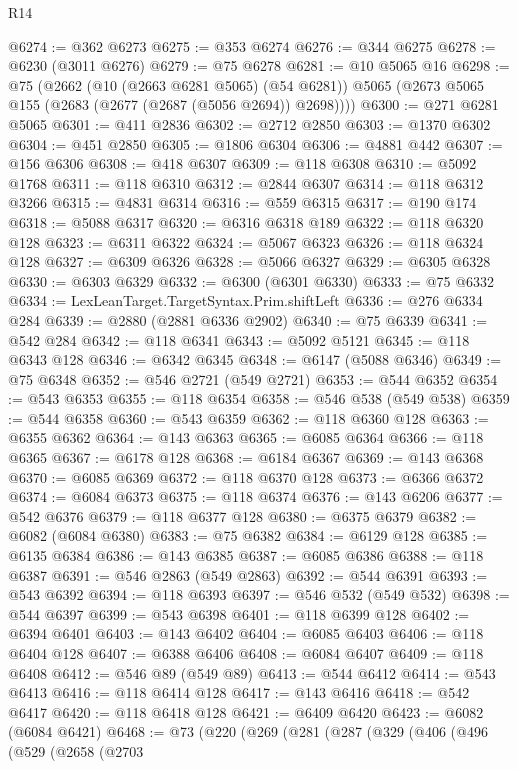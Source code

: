 \begin{lexlean}{R14}
\begin{coremodule}
{{{{{{{{{{{{{{{{{{{{{{{{{{{{{{{{{{{{{{{{{{{{{{{{{{{{{{{{{{{{{{{{{{{{{{{{{{{{{{{{{{@6274 := @362 @6273
@6275 := @353 @6274
@6276 := @344 @6275
@6278 := @6230 (@3011 @6276)
@6279 := @75 @6278
@6281 := @10 @5065 @16
@6298 := @75
    (@2662
      (@10 (@2663 @6281 @5065) (@54 @6281))
      @5065
      (@2673 @5065 @155 (@2683 (@2677 (@2687 (@5056 @2694)) @2698))))
@6300 := @271 @6281 @5065
@6301 := @411 @2836
@6302 := @2712 @2850
@6303 := @1370 @6302
@6304 := @451 @2850
@6305 := @1806 @6304
@6306 := @4881 @442
@6307 := @156 @6306
@6308 := @418 @6307
@6309 := @118 @6308
@6310 := @5092 @1768
@6311 := @118 @6310
@6312 := @2844 @6307
@6314 := @118 @6312 @3266
@6315 := @4831 @6314
@6316 := @559 @6315
@6317 := @190 @174
@6318 := @5088 @6317
@6320 := @6316 @6318 @189
@6322 := @118 @6320 @128
@6323 := @6311 @6322
@6324 := @5067 @6323
@6326 := @118 @6324 @128
@6327 := @6309 @6326
@6328 := @5066 @6327
@6329 := @6305 @6328
@6330 := @6303 @6329
@6332 := @6300 (@6301 @6330)
@6333 := @75 @6332
@6334 := LexLeanTarget.TargetSyntax.Prim.shiftLeft
@6336 := @276 @6334 @284
@6339 := @2880 (@2881 @6336 @2902)
@6340 := @75 @6339
@6341 := @542 @284
@6342 := @118 @6341
@6343 := @5092 @5121
@6345 := @118 @6343 @128
@6346 := @6342 @6345
@6348 := @6147 (@5088 @6346)
@6349 := @75 @6348
@6352 := @546 @2721 (@549 @2721)
@6353 := @544 @6352
@6354 := @543 @6353
@6355 := @118 @6354
@6358 := @546 @538 (@549 @538)
@6359 := @544 @6358
@6360 := @543 @6359
@6362 := @118 @6360 @128
@6363 := @6355 @6362
@6364 := @143 @6363
@6365 := @6085 @6364
@6366 := @118 @6365
@6367 := @6178 @128
@6368 := @6184 @6367
@6369 := @143 @6368
@6370 := @6085 @6369
@6372 := @118 @6370 @128
@6373 := @6366 @6372
@6374 := @6084 @6373
@6375 := @118 @6374
@6376 := @143 @6206
@6377 := @542 @6376
@6379 := @118 @6377 @128
@6380 := @6375 @6379
@6382 := @6082 (@6084 @6380)
@6383 := @75 @6382
@6384 := @6129 @128
@6385 := @6135 @6384
@6386 := @143 @6385
@6387 := @6085 @6386
@6388 := @118 @6387
@6391 := @546 @2863 (@549 @2863)
@6392 := @544 @6391
@6393 := @543 @6392
@6394 := @118 @6393
@6397 := @546 @532 (@549 @532)
@6398 := @544 @6397
@6399 := @543 @6398
@6401 := @118 @6399 @128
@6402 := @6394 @6401
@6403 := @143 @6402
@6404 := @6085 @6403
@6406 := @118 @6404 @128
@6407 := @6388 @6406
@6408 := @6084 @6407
@6409 := @118 @6408
@6412 := @546 @89 (@549 @89)
@6413 := @544 @6412
@6414 := @543 @6413
@6416 := @118 @6414 @128
@6417 := @143 @6416
@6418 := @542 @6417
@6420 := @118 @6418 @128
@6421 := @6409 @6420
@6423 := @6082 (@6084 @6421)
@6468 := @73
    (@220
      (@269
        (@281
          (@287
            (@329
              (@406
                (@496
                  (@529
                    (@2658
                      (@2703
}}}}}}}}}}}}}}}}}}}}}}}}}}}}}}}}}}}}}}}}}}}}}}}}}}}}}}}}}}}}}}}}}}}}}}}}}}}}}}}}}}
\end{coremodule}
\end{lexlean}
